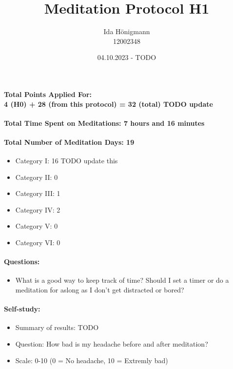 \documentclass[11pt,a4paper]{article}
\begin{document}
\title{Meditation Protocol H1 \\}
\author{Ida Hönigmann \\ 12002348}
\date{04.10.2023 - TODO}
\maketitle

\paragraph{Total Points Applied For:\\ 4 (H0) + 28 (from this protocol) = 32 (total) TODO update}
\paragraph{Total Time Spent on Meditations: 7 hours and 16 minutes}
\paragraph{Total Number of Meditation Days: 19}

\begin{itemize}
    \item Category I: 16 TODO update this
    \item Category II: 0
    \item Category III: 1
    \item Category IV: 2
    \item Category V: 0
    \item Category VI: 0
\end{itemize}

\paragraph{Questions:}
\begin{itemize}
    \item What is a good way to keep track of time? Should I set a timer or do a meditation for aslong as I don't get distracted or bored?
\end{itemize}

\paragraph{Self-study:}
\begin{itemize}
    \item Summary of results: TODO
    \item Question: How bad is my headache before and after meditation?
    \item Scale: 0-10 (0 = No headache, 10 = Extremly bad)
\end{itemize}
\end{document}
